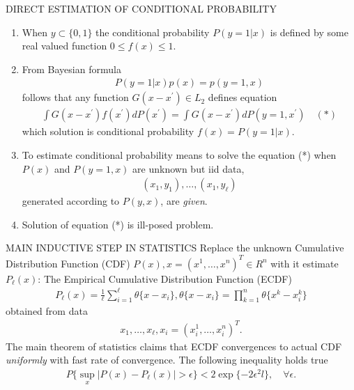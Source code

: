 \documentclass[11pt]{beamer}
\begin{document}
\begin{frame}{DIRECT ESTIMATION OF CONDITIONAL PROBABILITY}
\begin{enumerate}
\item When $y \subset \{0, 1\}$ the conditional probability $P(y=1|x)$ is defined by some real valued function $0 \leq f(x) \leq 1$.
\item From Bayesian formula
\begin{align*}
P(y=1|x)p(x) = p(y=1,x)
\end{align*}
follows that any function $G(x - x^{\prime}) \in L_{2}$ defines equation
\begin{align*}
\int G(x-x^{\prime})f(x^{\prime})dP(x^{\prime}) = \int G(x-x^{\prime})dP(y=1, x^{\prime}) \quad (*)
\end{align*}
which solution is conditional probability $f(x) = P(y=1|x)$.
\item To estimate conditional probability means to solve the equation (*) when $P(x)$ and $P(y=1, x)$ are unknown but iid data,
\begin{align*}
(x_{1}, y_{1}), \ldots, (x_{1}, y_{\ell})
\end{align*}
generated according to $P(y, x)$, are \emph{given}.
\item Solution of equation (*) is ill-posed problem.
\end{enumerate}
\end{frame}


\begin{frame}{MAIN INDUCTIVE STEP IN STATISTICS}
Replace the unknown Cumulative Distribution Function (CDF) $P(x), x = (x^{1}, \ldots, x^{n})^{T} \in R^{n}$ with it estimate $P_{\ell}(x)$: The Empirical Cumulative Distribution Function (ECDF)
\begin{align*}
P_{\ell}(x) = \frac{1}{\ell}\sum_{i=1}^{\ell}\theta\{x - x_{i}\}, \theta\{x - x_{i}\} = \prod_{k=1}^{n}\theta\{x^{k} - x_{i}^{k}\}
\end{align*}
obtained from data
\begin{align*}
x_{1}, \ldots, x_{\ell}, x_{i} = (x_{i}^{1}, \ldots, x_{i}^{n})^{T}.
\end{align*}
The main theorem of statistics claims that ECDF convergences to actual CDF \emph{uniformly} with fast rate of convergence. The following inequality holds true
\begin{align*}
P\{\sup_{x}^{} |P(x) - P_{\ell}(x)| > \epsilon\} < 2\exp\{-2\epsilon^{2}l\}, \quad \forall \epsilon.
\end{align*}
\end{frame}
\end{document}
